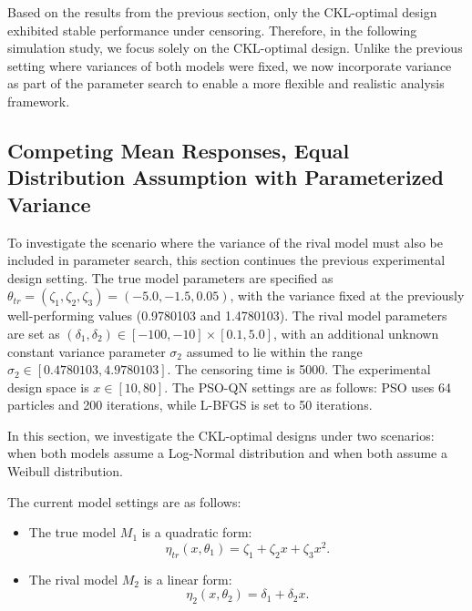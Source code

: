 \hspace*{8mm} Based on the results from the previous section, only the CKL-optimal design exhibited stable performance under censoring. Therefore, in the following simulation study, we focus solely on the CKL-optimal design. Unlike the previous setting where variances of both models were fixed, we now incorporate variance as part of the parameter search to enable a more flexible and realistic analysis framework.

\subsection{Competing Mean Responses, Equal Distribution Assumption with  Parameterized Variance} \label{SEC:DeviceA estimate variance}

\hspace*{8mm} To investigate the scenario where the variance of the rival model must also be included in parameter search, this section continues the previous experimental design setting. The true model parameters are specified as $\theta_{tr} = (\zeta_1, \zeta_2, \zeta_3) = (-5.0, -1.5, 0.05)$, with the variance fixed at the previously well-performing values (0.9780103 and 1.4780103). The rival model parameters are set as $(\delta_1, \delta_2) \in [-100, -10] \times [0.1, 5.0]$, with an additional unknown constant variance parameter $\sigma_2$ assumed to lie within the range $\sigma_2 \in [0.4780103, 4.9780103]$. The censoring time is 5000. The experimental design space is $x \in [10, 80]$. The PSO-QN settings are as follows: PSO uses 64 particles and 200 iterations, while L-BFGS is set to 50 iterations. 

\hspace*{8mm} In this section, we investigate the CKL-optimal designs under two scenarios: when both models assume a Log-Normal distribution and when both assume a Weibull distribution.

The current model settings are as follows:

\begin{itemize}
\item The true model $M_1$ is a quadratic form:
\begin{equation}
\eta_{tr}(x,\theta_1)=\zeta_1+\zeta_2x+\zeta_3x^2.
\end{equation}

\item The rival model $M_2$ is a linear form:
\begin{equation}
\eta_{2}(x,\theta_2)=\delta_1+\delta_2x.
\end{equation}

\end{itemize}

